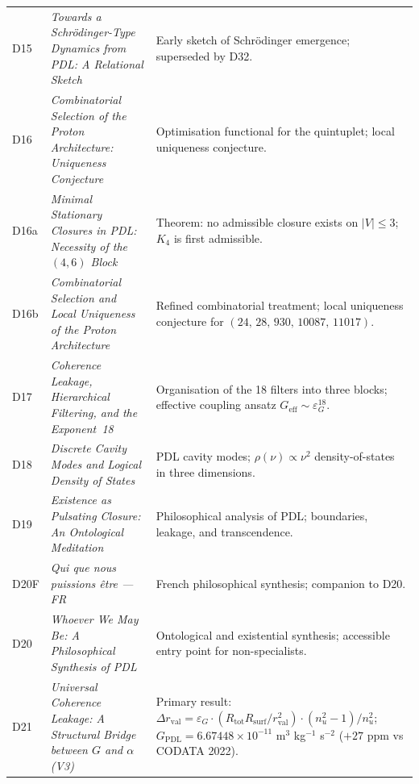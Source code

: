 \documentclass[11pt,a4paper]{article}
\theoremstyle{plain}
\theoremstyle{definition}
\theoremstyle{remark}
\newcommand{\Kfour}{K_4}
\newcommand{\quintuplet}{(24,\,28,\,930,\,10087,\,11017)}
\newcommand{\Geff}{G_{\mathrm{eff}}}
\newcommand{\GPDL}{G_{\mathrm{PDL}}}
\newcommand{\epsG}{\varepsilon_G}
\newcommand{\rval}{r_{\mathrm{val}}}
\begin{document}
\begin{longtable}{@{}L{1.3cm}L{3.8cm}L{8.0cm}@{}}
D15 & \textit{Towards a Schr\"odinger-Type Dynamics from PDL: A Relational Sketch}~\citep{D15} & Early sketch of Schr\"odinger emergence; superseded by D32. \\[0.3em]

D16 & \textit{Combinatorial Selection of the Proton Architecture: Uniqueness Conjecture}~\citep{D16} & Optimisation functional for the quintuplet; local uniqueness conjecture. \\[0.3em]

D16a & \textit{Minimal Stationary Closures in PDL: Necessity of the $(4,6)$ Block}~\citep{D16a} & \textcolor{proofblue}{Theorem}: no admissible closure exists on $|V|\leq 3$; $\Kfour$ is first admissible. \\[0.3em]

D16b & \textit{Combinatorial Selection and Local Uniqueness of the Proton Architecture}~\citep{D16b} & Refined combinatorial treatment; local uniqueness conjecture for $\quintuplet$. \\[0.3em]

D17 & \textit{Coherence Leakage, Hierarchical Filtering, and the Exponent~18}~\citep{D17} & Organisation of the 18 filters into three blocks; effective coupling ansatz $\Geff\sim\epsG^{18}$. \\[0.3em]

D18 & \textit{Discrete Cavity Modes and Logical Density of States}~\citep{D18} & PDL cavity modes; $\rho(\nu)\propto\nu^2$ density-of-states in three dimensions. \\[0.3em]

D19 & \textit{Existence as Pulsating Closure: An Ontological Meditation}~\citep{D19} & Philosophical analysis of PDL; boundaries, leakage, and transcendence. \\[0.3em]

D20F & \textit{Qui que nous puissions \^etre — FR}~\citep{D20F} & French philosophical synthesis; companion to D20. \\[0.3em]

D20 & \textit{Whoever We May Be: A Philosophical Synthesis of PDL}~\citep{D20} & Ontological and existential synthesis; accessible entry point for non-specialists. \\[0.3em]

D21 & \textit{Universal Coherence Leakage: A Structural Bridge between $G$ and $\alpha$ (V3)}~\citep{D21} & \textcolor{proofblue}{Primary result}: $\Delta\rval = \epsG\cdot(R_{\mathrm{tot}}R_{\mathrm{surf}}/\rval^2)\cdot(n_u^2-1)/n_u^2$; $\GPDL = 6.67448\times 10^{-11}$ m$^3$ kg$^{-1}$ s$^{-2}$ ($+27$ ppm vs CODATA 2022). \\[0.3em]


\end{longtable}
\end{document}
